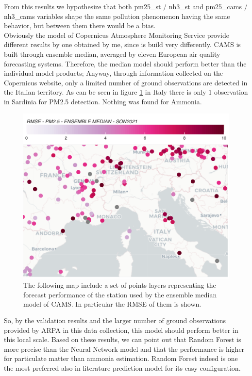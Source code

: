 From this results we hypothesize that both pm25\_st / nh3\_st and pm25\_cams / nh3\_cams variables shape the same pollution phenomenon having the same behavior, but between them there would be a bias.\\
Obviously the model of Copernicus Atmosphere Monitoring Service provide different results by one obtained by me, since is build very differently. CAMS is built through ensemble median, averaged by eleven European air quality forecasting systems. Therefore, the median model should perform better than the individual model products\cite{riccio2007seeking}; 
Anyway, through information collected on the Copernicus website, only a limited number of ground observations are detected in the Italian territory. As can be seen in figure \ref{fig:cams} in Italy there is only 1 observation in Sardinia for PM2.5 detection. Nothing was found for Ammonia.
\begin{figure}[H]
    \centering
    \includegraphics[scale=0.2]{images/cams_obs.png}
    \caption{The following map include a set of points layers representing the forecast performance of the station used by the ensemble median model of CAMS. In particular the RMSE of them is shown\cite{camsobs}. 
}
    \label{fig:cams}
\end{figure}

So, by the validation results and the larger number of ground observations provided by ARPA in this data collection, this model should perform better in this local scale.
\bigbreak
Based on these results, we can point out that Random Forest is more precise than the  Neural Network model and that the performance is higher for particulate matter than ammonia estimation.
Random Forest indeed is one the most preferred also in literature prediction model for its easy configuration.
